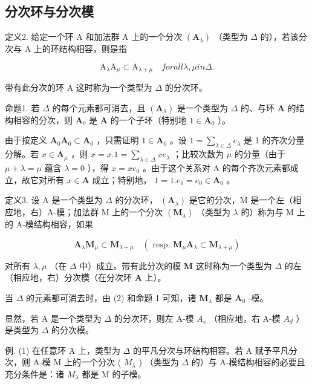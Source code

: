 \subsection{分次环与分次模}

定义2. 给定一个环 A 和加法群 A 上的一个分次 \((\mathbf{A}_{\lambda})\) （类型为 \(\Delta\) 的），若该分次与 A 上的环结构相容，则是指

\[
\mathrm{A} _ {\lambda} \mathrm{A} _ {\mu} \subset \mathrm{A} _ {\lambda + \mu} \quad f o r a l l \lambda , \mu i n \Delta .\tag{1}
\]

带有此分次的环 A 这时称为一个类型为 \(\Delta\) 的分次环。

命题1. 若 \(\Delta\) 的每个元素都可消去，且 \((\mathbf{A}_{\lambda})\) 是一个类型为 \(\Delta\) 的、与环 \(\mathbf{A}\) 的结构相容的分次，则 \(\mathbf{A}_0\) 是 \(\mathbf{A}\) 的一个子环（特别地 \(1 \in \mathbf{A}_0\) ）。

由于按定义 \(\mathbf{A}_0\mathbf{A}_0\subset \mathbf{A}_0\) ，只需证明 \(1\in \mathbf{A}_0\) 。设 \(1 = \sum_{\lambda \in \Delta}e_{\lambda}\) 是 1 的齐次分量分解。若 \(x\in \mathbf{A}_{\mu}\) ，则 \(x = x.1 = \sum_{\lambda \in \Delta}xe_{\lambda}\) ；比较次数为 \(\mu\) 的分量（由于 \(\mu +\lambda = \mu\) 蕴含 \(\lambda = 0\) ），得 \(x = xe_0\) 。由于这个关系对 A 的每个齐次元素都成立，故它对所有 \(x\in \mathbf{A}\) 成立；特别地， \(1 = 1.e_0 = e_0\in \mathbf{A}_0\) 。

定义3. 设 A 是一个类型为 \(\Delta\) 的分次环， \((\mathbf{A}_{\lambda})\) 是它的分次，M 是一个左（相应地，右）A-模；加法群 M 上的一个分次 \((\mathbf{M}_{\lambda})\) （类型为 \(\lambda\) 的）称为与 M 上的 A-模结构相容，如果

\[
\mathbf {A} _ {\lambda} \mathbf {M} _ {\mu} \subset \mathbf {M} _ {\lambda + \mu} \quad (\text { resp. } \mathbf {M} _ {\mu} \mathbf {A} _ {\lambda} \subset \mathbf {M} _ {\lambda + \mu})\tag{2}
\]

对所有 \(\lambda, \mu\) （在 \(\Delta\) 中）成立。带有此分次的模 \(\mathbf{M}\) 这时称为一个类型为 \(\Delta\) 的左（相应地，右）分次模（在分次环 \(\mathbf{A}\) 上）。

当 \(\Delta\) 的元素都可消去时，由 (2) 和命题 1 可知，诸 \(\mathbf{M}_{\lambda}\) 都是 \(\mathbf{A}_0\) -模。

显然，若 A 是一个类型为 \(\Delta\) 的分次环，则左 A-模 \(A_{s}\) （相应地，右 A-模 \(A_{d}\) ）是类型为 \(\Delta\) 的分次模。

例. (1) 在任意环 A 上，类型为 \(\Delta\) 的平凡分次与环结构相容。若 A 赋予平凡分次，则 A-模 M 上的一个分次 ( \(M_{\lambda}\) ) （类型为 \(\Delta\) 的）与 A-模结构相容的必要且充分条件是：诸 \(M_{\lambda}\) 都是 M 的子模。

